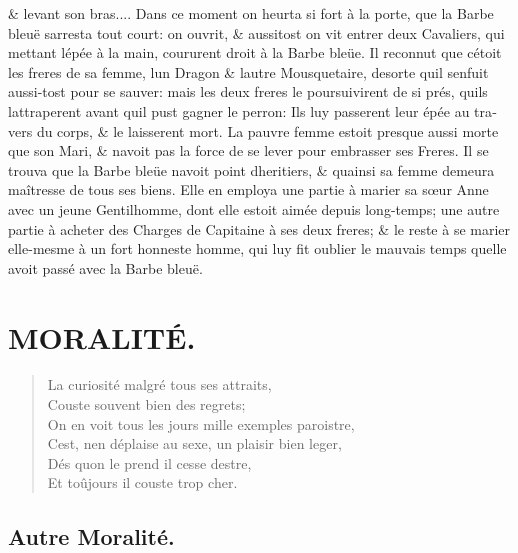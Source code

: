 \documentclass[14pt,a4paper]{memoir}
\newcommand{\notesection}[1]{%
  \addtonotes{\protect\par\protect\vspace{2ex}\protect\noindent\textbf{#1}\protect\par\protect\vspace{1ex}}%
}
\begin{document}
{{\begin{otherlanguage}{french}
\& levant son bras.... Dans ce moment on heurta si fort à la porte, que
la Barbe bleuë s\textquotesingle arresta tout court: on ouvrit, \&
aussitost on vit entrer deux Cavaliers, qui mettant
l\textquotesingle épée à la main, coururent droit à la Barbe bleüe. Il
reconnut que c\textquotesingle étoit les freres de sa femme,
l\textquotesingle un Dragon \& l\textquotesingle autre Mousquetaire,
desorte qu\textquotesingle il s\textquotesingle enfuit aussi-tost pour
se sauver: mais les deux freres le poursuivirent de si prés,
qu\textquotesingle ils l\textquotesingle attraperent avant
qu\textquotesingle il pust gagner le perron: Ils luy passerent leur épée
au travers du corps, \& le laisserent mort. La pauvre femme estoit
presque aussi morte que son Mari, \& n\textquotesingle avoit pas la
force de se lever pour embrasser ses Freres. Il se trouva que la Barbe
bleüe n\textquotesingle avoit point d\textquotesingle heritiers, \&
qu\textquotesingle ainsi sa femme demeura maîtresse de tous ses biens.
Elle en employa une partie à marier sa sœur Anne avec un jeune
Gentilhomme, dont elle estoit aimée depuis long-temps; une autre partie
à acheter des Charges de Capitaine à ses deux freres; \& le reste à se
marier elle-mesme à un fort honneste homme, qui luy fit oublier le
mauvais temps qu\textquotesingle elle avoit passé avec la Barbe bleuë. \\

\section{MORALITÉ.}
\notesection{MORALITÉ.}

\begin{verse}
  \small
La curiosité malgré tous ses attraits, \\
Couste souvent bien des regrets; \\
On en voit tous les jours mille exemples paroistre, \\
C\textquotesingle est, n\textquotesingle en déplaise au sexe, un plaisir bien leger, \\
Dés qu\textquotesingle on le prend il cesse d\textquotesingle estre, \\
Et toûjours il couste trop cher.

\end{verse}

\subsection{Autre Moralité.}


\end{otherlanguage}}}
\end{document}

